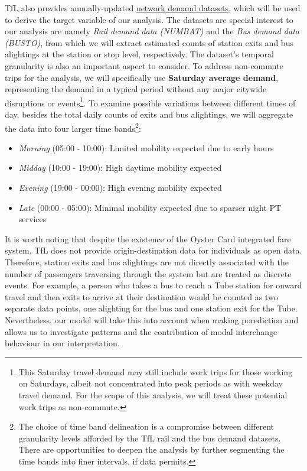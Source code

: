 TfL also provides annually-updated \href{http://crowding.data.tfl.gov.uk/}{network demand datasets}, which will be used to derive the target variable of our analysis. The datasets are special interest to our analysis are namely \textit{Rail demand data (NUMBAT)} and the \textit{Bus demand data (BUSTO)}, from which we will extract estimated counts of station exits and bus alightings at the station or stop level, respectively. The dataset's temporal granularity is also an important aspect to consider. To address non-commute trips for the analysis, we will specifically use \textbf{Saturday average demand}, representing the demand in a typical period without any major citywide disruptions or events\footnote{This Saturday travel demand may still include work trips for those working on Saturdays, albeit not concentrated into peak periods as with weekday travel demand. For the scope of this analysis, we will treat these potential work trips as non-commute.}. To examine possible variations between different times of day, besides the total daily counts of exits and bus alightings, we will aggregate the data into four larger time bands\footnote{The choice of time band delineation is a compromise between different granularity levels afforded by the TfL rail and the bus demand datasets. There are opportunities to deepen the analysis by further segmenting the time bands into finer intervals, if data permits.}:

\begin{itemize}
    \setlength\itemsep{-0.2em}
    \item \textit{Morning} (05:00 - 10:00): Limited mobility expected due to early hours
    \item \textit{Midday} (10:00 - 19:00): High daytime mobility expected
    \item \textit{Evening} (19:00 - 00:00): High evening mobility expected
    \item \textit{Late} (00:00 - 05:00): Minimal mobility expected due to sparser night PT services
\end{itemize}

It is worth noting that despite the existence of the Oyster Card integrated fare system, TfL does not provide origin-destination data for individuals as open data. Therefore, station exits and bus alightings are not directly associated with the number of passengers traversing through the system but are treated as discrete events. For example, a person who takes a bus to reach a Tube station for onward travel and then exits to arrive at their destination would be counted as two separate data points, one alighting for the bus and one station exit for the Tube. Nevertheless, our model will take this into account when making porediction and allows us to investigate patterns and the contribution of modal interchange behaviour in our interpretation.

